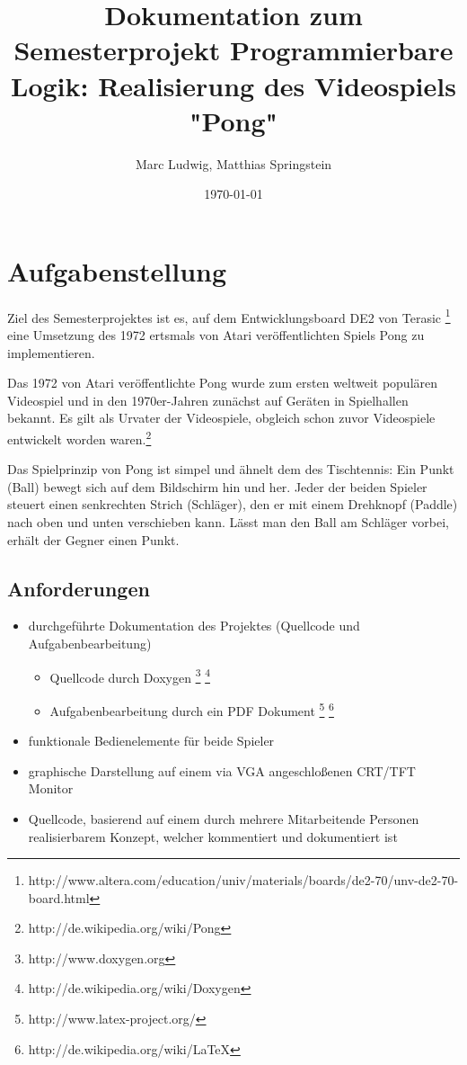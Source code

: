 \documentclass{article}
\title{Dokumentation zum Semesterprojekt Programmierbare Logik: Realisierung des Videospiels "Pong"}
\author{Marc Ludwig, Matthias Springstein}
\date{\today}
\begin{document}
\maketitle
\newpage

\tableofcontents
\newpage

\section{Aufgabenstellung}
Ziel des Semesterprojektes ist es, auf dem Entwicklungsboard DE2 von Terasic 
\footnote{http://www.altera.com/education/univ/materials/boards/de2-70/unv-de2-70-board.html}
eine Umsetzung des 1972 ertsmals von Atari veröffentlichten Spiels Pong zu implementieren.

Das 1972 von Atari veröffentlichte Pong wurde zum ersten weltweit populären Videospiel und in den 
1970er-Jahren zunächst auf Geräten in Spielhallen bekannt. Es gilt als Urvater der Videospiele, 
obgleich schon zuvor Videospiele entwickelt worden waren.\footnote{http://de.wikipedia.org/wiki/Pong}

Das Spielprinzip von Pong ist simpel und ähnelt dem des Tischtennis: Ein Punkt (Ball) bewegt sich 
auf dem Bildschirm hin und her. Jeder der beiden Spieler steuert einen senkrechten Strich 
(Schläger), den er mit einem Drehknopf (Paddle) nach oben und unten verschieben kann. Lässt man 
den Ball am Schläger vorbei, erhält der Gegner einen Punkt.


\subsection{Anforderungen}
\begin{itemize}
  \item durchgeführte Dokumentation des Projektes (Quellcode und Aufgabenbearbeitung)
  	\begin{itemize} 
  	\item Quellcode durch Doxygen 
  		\footnote{http://www.doxygen.org} 
  		\footnote{http://de.wikipedia.org/wiki/Doxygen}
  	\item Aufgabenbearbeitung durch ein PDF Dokument
  		\footnote{http://www.latex-project.org/}
  		\footnote{http://de.wikipedia.org/wiki/LaTeX}
  	\end{itemize} 
  \item funktionale Bedienelemente für beide Spieler
  \item graphische Darstellung auf einem via VGA angeschloßenen CRT/TFT Monitor
  \item Quellcode, basierend auf einem durch mehrere Mitarbeitende Personen realisierbarem Konzept, 
  		welcher kommentiert und dokumentiert ist
\end{itemize}
\end{document}
